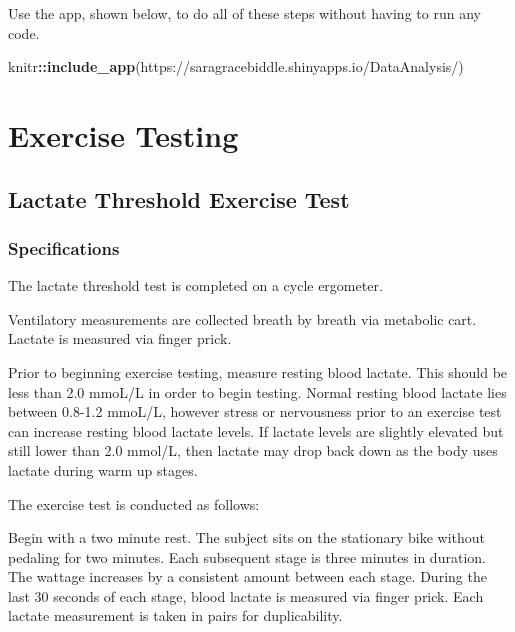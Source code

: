 \documentclass[
]{book}
\newenvironment{Shaded}{\begin{snugshade}}{\end{snugshade}}
\newcommand{\FunctionTok}[1]{\textcolor[rgb]{0.13,0.29,0.53}{\textbf{#1}}}
\newcommand{\NormalTok}[1]{#1}
\newcommand{\SpecialCharTok}[1]{\textcolor[rgb]{0.81,0.36,0.00}{\textbf{#1}}}
\newcommand{\StringTok}[1]{\textcolor[rgb]{0.31,0.60,0.02}{#1}}
\begin{document}
Use the app, shown below, to do all of these steps without having to run any code.

\begin{Shaded}
\begin{Highlighting}[]
\NormalTok{knitr}\SpecialCharTok{::}\FunctionTok{include\_app}\NormalTok{(}\StringTok{\textquotesingle{}https://saragracebiddle.shinyapps.io/DataAnalysis/\textquotesingle{}}\NormalTok{)}
\end{Highlighting}
\end{Shaded}

\hypertarget{ExerciseTesting}{%
\chapter{Exercise Testing}\label{ExerciseTesting}}

\hypertarget{ExerciseTesting-LT}{%
\section{Lactate Threshold Exercise Test}\label{ExerciseTesting-LT}}

\hypertarget{ExerciseTesting-LT-Specs}{%
\subsection{Specifications}\label{ExerciseTesting-LT-Specs}}

The lactate threshold test is completed on a cycle ergometer.

Ventilatory measurements are collected breath by breath via metabolic cart.
Lactate is measured via finger prick.

Prior to beginning exercise testing, measure resting blood lactate. This should be less than 2.0 mmoL/L in order to begin testing. Normal resting blood lactate lies between 0.8-1.2 mmoL/L, however stress or nervousness prior to an exercise test can increase resting blood lactate levels. If lactate levels are slightly elevated but still lower than 2.0 mmol/L, then lactate may drop back down as the body uses lactate during warm up stages.

The exercise test is conducted as follows:

Begin with a two minute rest. The subject sits on the stationary bike without pedaling for two minutes.
Each subsequent stage is three minutes in duration. The wattage increases by a consistent amount between each stage. During the last 30 seconds of each stage, blood lactate is measured via finger prick. Each lactate measurement is taken in pairs for duplicability.
\end{document}

